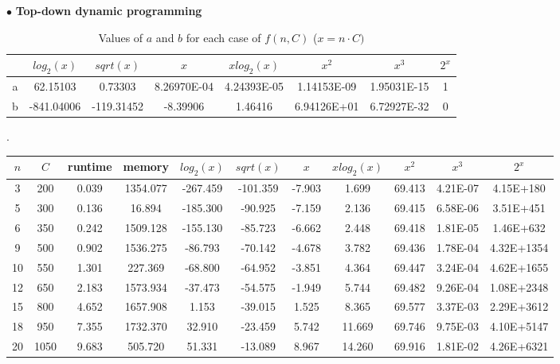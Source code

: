 \documentclass{article}
\begin{document}
\indent $\bullet$ \textbf{Top-down dynamic programming}
\begin{center}
\begin{table}[H]
    \begin{adjustbox}{width=1.1\textwidth,center}
        \begin{tabular}{|c|c|c|c|c|c|c|c|}
        \hline
        {} & $log_2(x)$ & $sqrt(x)$ & $x$ & $xlog_2(x)$ & $x^2$ & $x^3$ & $2^x$ \\
        \hline
        a & 62.15103	&	0.73303	&	8.26970E-04	&	4.24393E-05	&	1.14153E-09	&	1.95031E-15	&	1	\\ 	\hline
        b & -841.04006	&	-119.31452	&	-8.39906	&	1.46416	&   6.94126E+01	&	6.72927E-32	&	 0	\\ 	\hline
        \end{tabular}
    \end{adjustbox}
    \caption{Values of $a$ and $b$ for each case of $f(n,C)$ ($x = n\cdot C)$}.
\end{table}
    \setlength{\LTleft}{-20cm plus -1.5fill}
    \setlength{\LTright}{\LTleft}
    \begin{longtable}{|c|c|c|c|c|c|c|c|c|c|c|}
    \hline
        $n$ & $C$ & runtime & memory & $log_2(x)$ & $sqrt(x)$ & $x$ & $xlog_2(x)$ & $x^2$ & $x^3$ & $2^x$ \\
        \hline
3	&	200	&	0.039	&	1354.077	&	-267.459	&	-101.359	&	-7.903	&	1.699	&	69.413	&	4.21E-07	&	4.15E+180	\\	\hline
5	&	300	&	0.136	&	16.894	&	-185.300	&	-90.925	&	-7.159	&	2.136	&	69.415	&	6.58E-06	&	3.51E+451	\\	\hline
6	&	350	&	0.242	&	1509.128	&	-155.130	&	-85.723	&	-6.662	&	2.448	&	69.418	&	1.81E-05	&	1.46E+632	\\	\hline
9	&	500	&	0.902	&	1536.275	&	-86.793	&	-70.142	&	-4.678	&	3.782	&	69.436	&	1.78E-04	&	4.32E+1354	\\	\hline
10	&	550	&	1.301	&	227.369	&	-68.800	&	-64.952	&	-3.851	&	4.364	&	69.447	&	3.24E-04	&	4.62E+1655	\\	\hline
12	&	650	&	2.183	&	1573.934	&	-37.473	&	-54.575	&	-1.949	&	5.744	&	69.482	&	9.26E-04	&	1.08E+2348	\\	\hline
15	&	800	&	4.652	&	1657.908	&	1.153	&	-39.015	&	1.525	&	8.365	&	69.577	&	3.37E-03	&	2.29E+3612	\\	\hline
18	&	950	&	7.355	&	1732.370	&	32.910	&	-23.459	&	5.742	&	11.669	&	69.746	&	9.75E-03	&	4.10E+5147	\\	\hline
20	&	1050	&	9.683	&	505.720	&	51.331	&	-13.089	&	8.967	&	14.260	&	69.916	&	1.81E-02	&	4.26E+6321	\\	\hline

\end{longtable}
\end{center}
\end{document}
